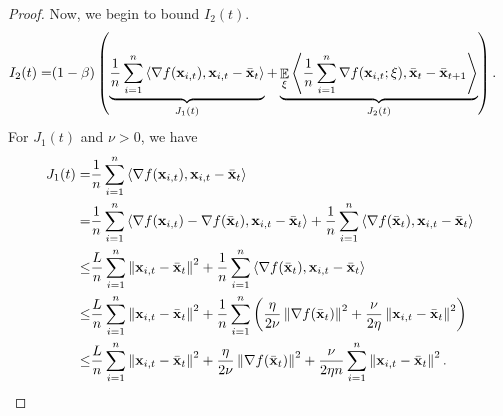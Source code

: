 \documentclass{article}
\begin{document}
\begin{proof}
Now, we begin to bound $I_2(t)$.
\begin{align}
\nonumber
I_2(t) = & (1-\beta) \left( \underbrace{ \frac{1}{n}\sum_{i=1}^n\left\langle\nabla f({\bf x}_{i,t}), {\bf x}_{i,t} - \bar{{\bf x}}_t  \right\rangle }_{J_1(t)} +  \underbrace{ \mathop{\mathbb{E}}_{\xi}\left\langle\frac{1}{n}\sum_{i=1}^n \nabla f({\bf x}_{i,t};\xi), \bar{{\bf x}}_t - \bar{{\bf x}}_{t+1}  \right\rangle}_{J_2(t)} \right).
\end{align} For $J_1(t)$ and $\nu>0$, we have
\begin{align}
\nonumber
J_1(t) = & \frac{1}{n}\sum_{i=1}^n\left\langle\nabla f({\bf x}_{i,t}), {\bf x}_{i,t} - \bar{{\bf x}}_t  \right\rangle \\ \nonumber
= & \frac{1}{n}\sum_{i=1}^n\left\langle\nabla f({\bf x}_{i,t}) - \nabla f(\bar{{\bf x}}_t), {\bf x}_{i,t} - \bar{{\bf x}}_t  \right\rangle + \frac{1}{n}\sum_{i=1}^n\left\langle\nabla f(\bar{{\bf x}}_t), {\bf x}_{i,t} - \bar{{\bf x}}_t  \right\rangle \\ \nonumber
\le & \frac{L}{n}\sum_{i=1}^n \left\lVert{\bf x}_{i,t} - \bar{{\bf x}}_t\right\rVert^2 + \frac{1}{n}\sum_{i=1}^n\left\langle\nabla f(\bar{{\bf x}}_t), {\bf x}_{i,t} - \bar{{\bf x}}_t  \right\rangle \\ \nonumber
\le & \frac{L}{n}\sum_{i=1}^n \left\lVert{\bf x}_{i,t} - \bar{{\bf x}}_t\right\rVert^2 + \frac{1}{n}\sum_{i=1}^n\left( \frac{\eta}{2\nu}\left\lVert\nabla f(\bar{{\bf x}}_t)\right\rVert^2 + \frac{\nu}{2\eta}\left\lVert{\bf x}_{i,t} - \bar{{\bf x}}_t \right\rVert^2  \right) \\ \label{equa_theorem_temp0}
\le & \frac{L}{n}\sum_{i=1}^n \left\lVert{\bf x}_{i,t} - \bar{{\bf x}}_t\right\rVert^2 + \frac{\eta}{2\nu}\left\lVert\nabla f(\bar{{\bf x}}_t)\right\rVert^2 + \frac{\nu}{2\eta n}\sum_{i=1}^n\left\lVert{\bf x}_{i,t} - \bar{{\bf x}}_t \right\rVert^2. 
\end{align}


\end{proof}
\end{document}
